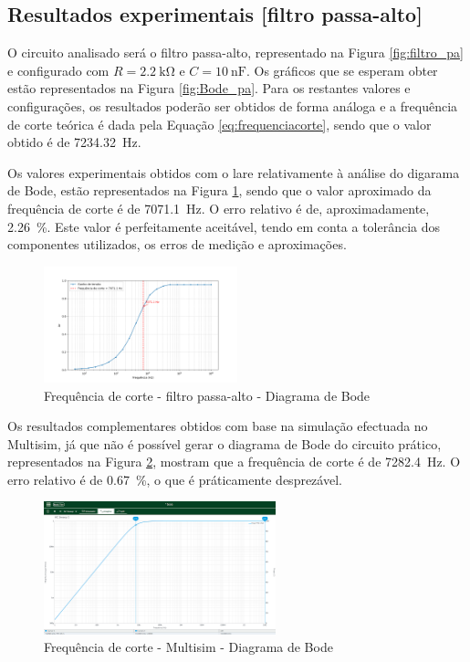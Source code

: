 \subsection{Resultados experimentais [filtro passa-alto]}
\label{sec:resultados_filtros_passaalto}
O circuito analisado será o filtro passa-alto, representado na Figura \ref{fig:filtro_pa} e configurado com $R=\SI{2.2}{\kilo\ohm}$ e $C=\SI{10}{\nano\farad}$. Os gráficos que se esperam obter estão representados na Figura \ref{fig:Bode_pa}. Para os restantes valores e configurações, os resultados poderão ser obtidos de forma análoga e a frequência de corte teórica é dada pela Equação \ref{eq:frequenciacorte}, sendo que o valor obtido é de \SI{7234.32}{\hertz}.

Os valores experimentais obtidos com o \acrshort{lare} relativamente à análise do digarama de Bode, estão representados na Figura \ref{fig:fcBode}, sendo que o valor aproximado da frequência de corte é de \SI{7071.1}{\hertz}. O erro relativo é de, aproximadamente, \SI{2.26}{\percent}. Este valor é perfeitamente aceitável, tendo em conta a tolerância dos componentes utilizados, os erros de medição e aproximações.

\begin{figure}[hbtp]
	\centering
	\includegraphics[width=0.5\textwidth]{figures/bode_hpf_fc.png}
	\caption{Frequência de corte - filtro passa-alto - Diagrama de Bode}
	\label{fig:fcBode}
\end{figure}

Os resultados complementares obtidos com base na simulação efectuada no Multisim, já que não é possível gerar o diagrama de Bode do circuito prático, representados na Figura \ref{fig:fcBodemultisim}, mostram que a frequência de corte é de \SI{7282.4}{\hertz}. O erro relativo é de \SI{0.67}{\percent}, o que é práticamente desprezável.

\begin{figure}[hbtp]
	\centering
	\includegraphics[width=0.6\textwidth]{figures/boda_HPF_fc.png}
	\caption{Frequência de corte - Multisim - Diagrama de Bode}
	\label{fig:fcBodemultisim}
\end{figure}

